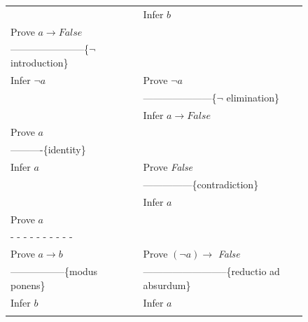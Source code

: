 \begin{figure}
\begin{spacing}{0.9}
\begin{center}
\begin{tabular}{ll}
                                                        & Infer $b$                                         \\
Prove $a \rightarrow False$                             &                                                   \\
-----------------------\{$\neg$ introduction\}          &                                                   \\
Infer $\neg a$                                          & Prove $\neg a$                                    \\
                                                        & ---------------------\{$\neg$ elimination\}       \\
                                                        & Infer $a \rightarrow False$                       \\
Prove $a$                                               &                                                   \\
----------\{identity\}                                  &                                                   \\
Infer $a$                                               & Prove \emph{False}                                \\
                                                        & ---------------\{contradiction\}                  \\
                                                        & Infer $a$                                         \\
Prove $a$                                               &                                                   \\
 - - - - - - - - - -                                    &                                                   \\
Prove $a \rightarrow b$                                 & Prove $(\neg a) \rightarrow$ \emph{False}         \\
-----------------\{modus ponens\}                       & --------------------------\{reductio ad absurdum\}\\
Infer $b$                                               & Infer $a$                                         \\
                                                        &                                                   \\
\end{tabular}

\end{center}
\end{spacing}
\end{figure}
